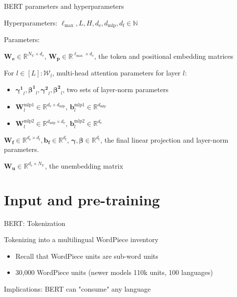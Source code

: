 \documentclass[12pt,aspectratio=169,handout]{beamer}
\begin{document}
\begin{frame}{BERT parameters and hyperparameters}
	
	\begin{minipage}[t][10cm][t]{15cm}
			
		Hyperparameters: $\ell_{\text{max}}, L, H, d_{\text{e}}, d_{\text{mlp}}, d_{\text{f}} \in \mathbb{N}$
		
		Parameters:
		
		$\bm{W_e} \in \mathbb{R}^{N_\text{V} \times d_\text{e}}$, $\bm{W_p} \in \mathbb{R}^{\ell_{\text{max}} \times d_\text{e}}$, the token and positional embedding matrices
		
		For $l \in [L]: \bm{\mathcal{W}}_l$, multi-head attention parameters for layer $l$:
		
		\begin{itemize}
		\item $\bm{\gamma^1}_l, \bm{\beta^1}_l, \bm{\gamma^2}_l, \bm{\beta^2}_l$, two sets of layer-norm parameters
		\item $\bm{W}^{\text{mlp1}}_l \in \mathbb{R}^{d_{\text{e}} \times d_\text{mlp}}$, $\bm{b}^{\text{mlp1}}_l \in \mathbb{R}^{d_\text{mlp}}$
		\item $\bm{W}^{\text{mlp2}}_l \in \mathbb{R}^{d_\text{mlp} \times d_{\text{e}}}$, $\bm{b}^{\text{mlp2}}_l \in \mathbb{R}^{d_\text{e}}$
		\end{itemize}
		
		
		
		
		$\bm{W_f} \in \mathbb{R}^{d_\text{e} \times d_\text{f}}, \bm{b_f} \in \mathbb{R}^{d_\text{f}}$, $\bm{\gamma},\bm{\beta} \in \mathbb{R}^{d_\text{f}}$, the final linear projection and layer-norm parameters.
		
		
		$\bm{W_u} \in \mathbb{R}^{d_\text{e} \times N_\text{V}}$, the unembedding matrix
		
	\end{minipage}
\end{frame}

\section{Input and pre-training}

\begin{frame}{BERT: Tokenization}
	
	Tokenizing into a multilingual WordPiece inventory
	
	\begin{itemize}
		\item Recall that WordPiece units are sub-word units
		\item 30,000 WordPiece units (newer models 110k units, 100 languages)
	\end{itemize}
	
	Implications: BERT can "consume" any language
	
	
\end{frame}
\end{document}
